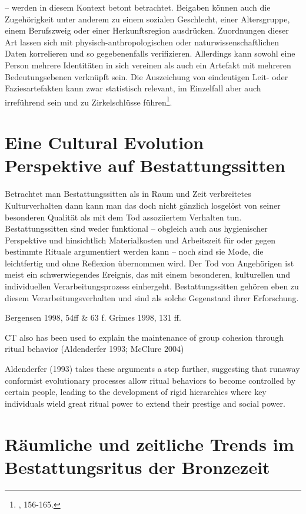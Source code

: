 \documentclass[openany,twoside,twocolumn]{book}
\let\rmarkdownfootnote\footnote%
\def\footnote{\protect\rmarkdownfootnote}
\begin{document}
-- werden in diesem Kontext betont betrachtet. Beigaben können auch die
Zugehörigkeit unter anderem zu einem sozialen Geschlecht, einer
Altersgruppe, einem Berufszweig oder einer Herkunftsregion ausdrücken.
Zuordnungen dieser Art lassen sich mit physisch-anthropologischen oder
naturwissenschaftlichen Daten korrelieren und so gegebenenfalls
verifizieren. Allerdings kann sowohl eine Person mehrere Identitäten in
sich vereinen als auch ein Artefakt mit mehreren Bedeutungsebenen
verknüpft sein. Die Auszeichung von eindeutigen Leit- oder
Faziesartefakten kann zwar statistisch relevant, im Einzelfall aber auch
irreführend sein und zu Zirkelschlüsse führen\footnote{\textcite{hofmann_rituelle_2008},
  156-165.}.

\hypertarget{eine-cultural-evolution-perspektive-auf-bestattungssitten}{%
\section{Eine Cultural Evolution Perspektive auf
Bestattungssitten}\label{eine-cultural-evolution-perspektive-auf-bestattungssitten}}

Betrachtet man Bestattungssitten als in Raum und Zeit verbreitetes
Kulturverhalten dann kann man das doch nicht gänzlich losgelöst von
seiner besonderen Qualität als mit dem Tod assoziiertem Verhalten tun.
Bestattungssitten sind weder funktional -- obgleich auch aus
hygienischer Perspektive und hinsichtlich Materialkosten und Arbeitszeit
für oder gegen bestimmte Rituale argumentiert werden kann -- noch sind
sie Mode, die leichtfertig und ohne Reflexion übernommen wird. Der Tod
von Angehörigen ist meist ein schwerwiegendes Ereignis, das mit einem
besonderen, kulturellen und individuellen Verarbeitungsprozess
einhergeht. Bestattungssitten gehören eben zu diesem
Verarbeitungsverhalten und sind als solche Gegenstand ihrer Erforschung.

Bergensen 1998, 54ff \& 63 f. Grimes 1998, 131 ff.

CT also has been used to explain the maintenance of group cohesion
through ritual behavior (Aldenderfer 1993; McClure 2004)

Aldenderfer (1993) takes these arguments a step further, suggesting that
runaway conformist evolutionary processes allow ritual behaviors to
become controlled by certain people, leading to the development of rigid
hierarchies where key individuals wield great ritual power to extend
their prestige and social power.

\hypertarget{regions-archaeological-overview}{%
\section{Räumliche und zeitliche Trends im Bestattungsritus der
Bronzezeit}\label{regions-archaeological-overview}}
\end{document}
